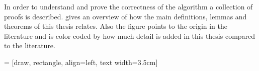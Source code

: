 \documentclass[twoside,11pt,openright]{report}
\begin{document}
In order to understand and prove the correctness of the algorithm a collection of proofs is described.  gives an overview of how the main definitions, lemmas and theorems of this thesis relates. Also the figure points to the origin in the literature and is color coded by how much detail is added in this thesis compared to the literature.

\setlength{\tabcolsep}{3pt}
 = [draw, rectangle, align=left, text width=3.5cm]
\newcommand{\nodecontent}[3]{%
  \parbox{3.5cm}{%
    \begin{tabular}{l p{2.2cm}}
      \multicolumn{2}{p{3.3cm}}{#1} \\
      \textit{Reference:} & #2 \\
      \textit{Literature:} & #3 \\
    \end{tabular}
  }%
}%
\newcommand{\coloredbox}[1] {\item[\mbox{\ooalign{\color{#1}\ding{110}\cr\hidewidth\color{black}$\square$\hidewidth\cr}}]}%
\end{document}
